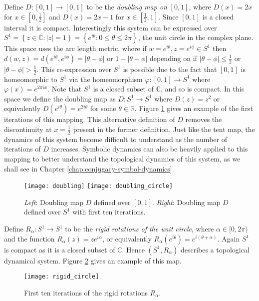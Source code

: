 \begin{exmp} \label{exmp:doubling-map}
    Define $D: [0,1] \to [0,1]$ to be the \emph{doubling map on} $[0, 1]$, where $D(x) = 2x$ for $x \in \left[0, \frac{1}{2}\right]$ and $D(x) = 2x - 1$ for $x \in \left[\frac{1}{2}, 1\right]$. Since $[0, 1]$ is a closed interval it is compact. Interestingly this system can be expressed over $S^1 = \left\lbrace z \in \mathbb{C}: |z| = 1 \right\rbrace = \left\lbrace e^{i\theta} : 0 \leq \theta \leq 2\pi \right\rbrace$, the unit circle in the complex plane. This space uses the arc length metric, where if $w = e^{i\theta}, z = e^{i\phi} \in S^1$ then $d(w, z) = d(e^{i\theta}, e^{i\phi}) = |\theta - \phi|$ or $1 - |\theta - \phi|$ depending on if $|\theta - \phi| \leq \frac{1}{2}$ or $|\theta - \phi| > \frac{1}{2}$. This re-expression over $S^1$ is possible due to the fact that $[0, 1]$ is homeomorphic to $S^1$ via the homeomorphism $\varphi : [0, 1] \to S^1$ where $\varphi(x) = e^{2\pi i x}$. Note that $S^1$ is a closed subset of $\mathbb{C}$, and so is compact. In this space we define the doubling map as $D: S^1 \to S^1$ where $D(z) = z^2$ or equivalently $D(e^{i\theta}) = e^{2i\theta}$ for some $\theta \in \mathbb{R}$. Figure \ref{fig:doubling} gives an example of the first iterations of this mapping. This alternative definition of $D$ removes the discontinuity at $x = \frac{1}{2}$ present in the former definition. Just like the tent map, the dynamics of this system become difficult to understand as the number of iterations of $D$ increases. Symbolic dynamics can also be heavily applied to this mapping to better understand the topological dynamics of this system, as we shall see in Chapter \ref{chap:conjugacy-symbol-dynamics}.

    \begin{figure}[H]
        \centering
        \texttt{[image: doubling]}
        \hspace{1cm}
        \texttt{[image: doubling\_circle]}
        \caption{\emph{Left}: Doubling map $D$ defined over $[0, 1]$. \emph{Right}: Doubling map $D$ defined over $S^1$ with first ten iterations.}
        \label{fig:doubling}
    \end{figure}
\end{exmp}

\begin{exmp} \label{exmp:rigid-rotations}
    Define $R_\alpha: S^1 \to S^1$ to be the \emph{rigid rotations of the unit circle}, where $\alpha \in [0, 2\pi)$ and the function $R_{\alpha}(z) = ze^{i\alpha}$, or equivalently $R_\alpha(e^{i\theta}) = e^{i(\theta + \alpha)}$. Again $S^1$ is compact as it is a closed subset of $\mathbb{C}$. Hence $(S^1, R_{\alpha})$ describes a topological dynamical system. Figure \ref{fig:rigid-circle} gives an example of this map.

    \begin{figure}[h]
        \centering
        \texttt{[image: rigid\_circle]}
        \caption{First ten iterations of the rigid rotations $R_\alpha$.}
        \label{fig:rigid-circle}
    \end{figure}
\end{exmp}

